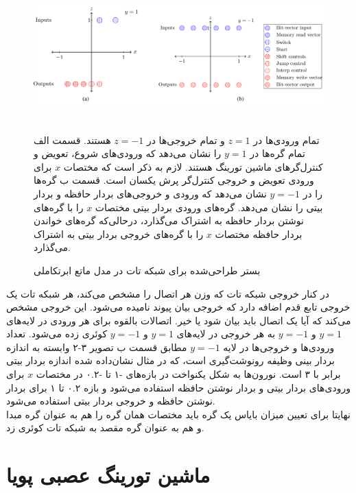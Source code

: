 \begin{figure}[!h]
\begin{center}
\includegraphics[height=5cm]{HyperENTM-Substrate.png}
\end{center}
\caption{بستر طراحی‌شده برای شبکه تات در مدل ماتع ابرتکاملی\cite{merrild2018hyperntm} }
\medskip
\small
تمام ورودی‌ها در $z=1$ و تمام خروجی‌ها در $z=-1$ هستند. قسمت الف تمام گره‌ها در $y=1$ را نشان می‌دهد که ورودی‌های شروع، تعویض و کنترل‌‌گرهای ماشین تورینگ هستند. لازم به ذکر است که مختصات $x$ برای ورودی تعویض و خروجی کنترل‌گر پرش یکسان است.
قسمت ب گره‌ها را در $y=-1‌$ نشان می‌دهد که ورودی و خروجی‌های بردار حافظه و بردار بیتی را نشان می‌دهد. گره‌های ورودی بردار بیتی مختصات $x$ را با گره‌های نوشتن بردار حافظه به اشتراک می‌گذارد، درحالی‌که گره‌های خواندن بردار حافظه مختصات $x$ را با گره‌های خروجی بردار بیتی به اشتراک می‌گذارد.\cite{merrild2018hyperntm}
\end{figure}

در کنار خروجی شبکه تات که وزن هر اتصال را مشخص می‌کند، هر شبکه تات یک خروجی تابع قدم اضافه دارد که خروجی بیان پیوند نامیده می‌شود. این خروجی مشخص می‌کند که آیا یک اتصال باید بیان شود یا خیر. اتصالات بالقوه برای هر ورودی در لایه‌های $y=1$ و $y=-1$ به هر خروجی در لایه‌های $y=1$ و $y=-1‌$ کوئری زده می‌شود. تعداد ورودی‌ها و خروجی‌ها در لایه $y=-1$ مطابق قسمت ب تصویر ۳-۲ وابسته به اندازه بردار بینی وظیفه رونوشت‌گیری است، که در مثال نشان‌داده شده اندازه بردار بیتی برابر با ۳ است. نورون‌ها به شکل یکنواخت در بازه‌های -۱ تا -۰.۲ در مختصات $x$ برای ورودی‌های بردار بیتی و بردار نوشتن حافظه استفاده می‌شود و بازه ۰.۲ تا ۱ برای بردار نوشتن حافظه و خروجی بردار بیتی استفاده می‌شود.\cite{merrild2018hyperntm} 
\\

نهایتا برای تعیین میزان بایاس یک گره باید مختصات همان گره را هم به عنوان گره مبدا و هم به عنوان گره مقصد به شبکه تات کوئری زد.\cite{merrild2018hyperntm}


\section{ماشین تورینگ عصبی پویا}
